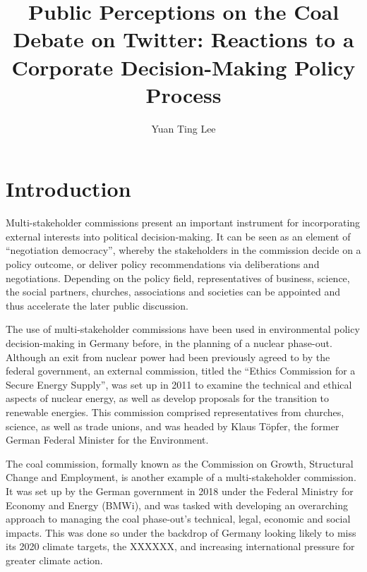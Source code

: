 \documentclass[10pt,twocolumn,twoside]{layout}
\title{Public Perceptions on the Coal Debate on Twitter: Reactions to a Corporate Decision-Making Policy Process}
\author[a,b]{Yuan Ting Lee}
\affil[a]{Hertie School, Friedrichstr. 180, Berlin 10117, Germany}
\affil[b]{Mercator Research Institute on Global Commons and Climate Change, Torgauer Str. 12 - 15, Berlin 10829, Germany}
\begin{document}
\onehalfspacing
\maketitle
\thispagestyle{firststyle}

\section*{Introduction} \label{sec:introduction}
Multi-stakeholder commissions present an important instrument for incorporating external interests into political decision-making. It can be seen as an element of ``negotiation democracy'', whereby the stakeholders in the commission decide on a policy outcome, or deliver policy recommendations via deliberations and negotiations. Depending on the policy field, representatives of business, science, the social partners, churches, associations and societies can be appointed and thus accelerate the later public discussion. \cite{Siefken2016}

The use of multi-stakeholder commissions have been used in environmental policy decision-making in Germany before, in the planning of a nuclear phase-out. Although an exit from nuclear power had been previously agreed to by the federal government, %
an external commission, titled the ``Ethics Commission for a Secure Energy Supply'', was set up in 2011 to examine the technical and ethical aspects of nuclear energy, as well as develop proposals for the transition to renewable energies. This commission comprised representatives from churches, science, as well as trade unions, and was headed by Klaus Töpfer, the former German Federal Minister for the Environment. %

The coal commission, formally known as the Commission on Growth, Structural Change and Employment, is another example of a multi-stakeholder commission. It was set up by the German government in 2018 under the Federal Ministry for Economy and Energy (BMWi), and was tasked with developing an overarching approach to managing the coal phase-out’s technical, legal, economic and social impacts. This was done so under the backdrop of Germany looking likely to miss its 2020 climate targets, the XXXXXX, and increasing international pressure for greater climate action. %
\end{document}
